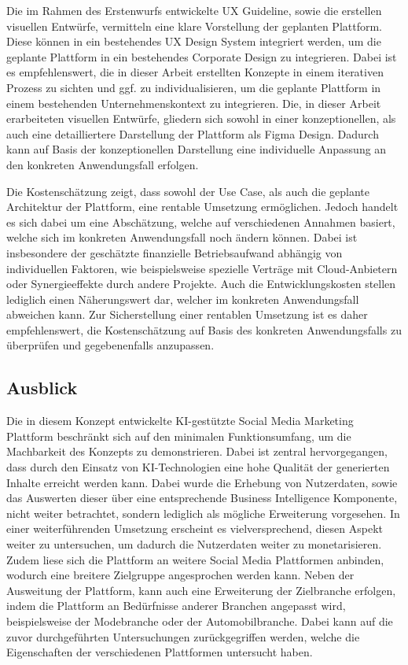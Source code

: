 Die im Rahmen des Erstenwurfs entwickelte UX Guideline, sowie die erstellen visuellen Entwürfe, vermitteln eine klare Vorstellung der geplanten Plattform.
Diese können in ein bestehendes UX Design System integriert werden, um die geplante Plattform in ein bestehendes Corporate Design zu integrieren.
Dabei ist es empfehlenswert, die in dieser Arbeit erstellten Konzepte in einem iterativen Prozess zu sichten und ggf. zu individualisieren, um die geplante Plattform in einem bestehenden Unternehmenskontext zu integrieren.
Die, in dieser Arbeit erarbeiteten visuellen Entwürfe, gliedern sich sowohl in einer konzeptionellen, als auch eine detailliertere Darstellung der Plattform als Figma Design.
Dadurch kann auf Basis der konzeptionellen Darstellung eine individuelle Anpassung an den konkreten Anwendungsfall erfolgen.

Die Kostenschätzung zeigt, dass sowohl der Use Case, als auch die geplante Architektur der Plattform, eine rentable Umsetzung ermöglichen.
Jedoch handelt es sich dabei um eine Abschätzung, welche auf verschiedenen Annahmen basiert, welche sich im konkreten Anwendungsfall noch ändern können.
Dabei ist insbesondere der geschätzte finanzielle Betriebsaufwand abhängig von individuellen Faktoren, wie beispielsweise spezielle Verträge mit Cloud-Anbietern oder Synergieeffekte durch andere Projekte.
Auch die Entwicklungskosten stellen lediglich einen Näherungswert dar, welcher im konkreten Anwendungsfall abweichen kann.
Zur Sicherstellung einer rentablen Umsetzung ist es daher empfehlenswert, die Kostenschätzung auf Basis des konkreten Anwendungsfalls zu überprüfen und gegebenenfalls anzupassen.

\subsection{Ausblick}
Die in diesem Konzept entwickelte KI-gestützte Social Media Marketing Plattform beschränkt sich auf den minimalen Funktionsumfang, um die Machbarkeit des Konzepts zu demonstrieren.
Dabei ist zentral hervorgegangen, dass durch den Einsatz von KI-Technologien eine hohe Qualität der generierten Inhalte erreicht werden kann.
Dabei wurde die Erhebung von Nutzerdaten, sowie das Auswerten dieser über eine entsprechende Business Intelligence Komponente, nicht weiter betrachtet, sondern lediglich als mögliche Erweiterung vorgesehen.
In einer weiterführenden Umsetzung erscheint es vielversprechend, diesen Aspekt weiter zu untersuchen, um dadurch die Nutzerdaten weiter zu monetarisieren.
Zudem liese sich die Plattform an weitere Social Media Plattformen anbinden, wodurch eine breitere Zielgruppe angesprochen werden kann.
Neben der Ausweitung der Plattform, kann auch eine Erweiterung der Zielbranche erfolgen, indem die Plattform an Bedürfnisse anderer Branchen angepasst wird, beispielsweise der Modebranche oder der Automobilbranche.
Dabei kann auf die zuvor durchgeführten Untersuchungen zurückgegriffen werden, welche die Eigenschaften der verschiedenen Plattformen untersucht haben.